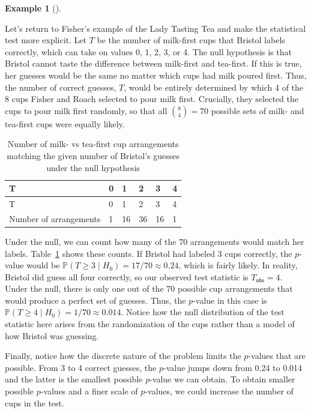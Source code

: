 \documentclass[
  13pt,
  letterpaper,
  DIV=11,
  numbers=noendperiod]{scrreprt}
\renewcommand{\P}{\mathbb{P}}
\theoremstyle{plain}
\theoremstyle{plain}
\theoremstyle{definition}
\theoremstyle{definition}
\newtheorem{example}{Example}[chapter]
\theoremstyle{remark}
\begin{document}
\begin{example}[]\protect\hypertarget{exm-lady-tasting-tea-2}{}\label{exm-lady-tasting-tea-2}

Let's return to Fisher's example of the Lady Tasting Tea and make the
statistical test more explicit. Let \(T\) be the number of milk-first
cups that Bristol labels correctly, which can take on values 0, 1, 2, 3,
or 4. The null hypothesis is that Bristol cannot taste the difference
between milk-first and tea-first. If this is true, her guesses would be
the same no matter which cups had milk poured first. Thus, the number of
correct guesses, \(T\), would be entirely determined by which 4 of the 8
cups Fisher and Roach selected to pour milk first. Crucially, they
selected the cups to pour milk first randomly, so that all
\(\binom{8}{4} = 70\) possible sets of milk- and tea-first cups were
equally likely.

\begin{longtable}[]{@{}llllll@{}}
\caption{Number of milk- vs tea-first cup arrangements matching the
given number of Bristol's guesses under the null
hypothesis}\label{tbl-lady-tasting-tea}\tabularnewline
\toprule\noalign{}
T & 0 & 1 & 2 & 3 & 4 \\
\midrule\noalign{}
\endfirsthead
\toprule\noalign{}
T & 0 & 1 & 2 & 3 & 4 \\
\midrule\noalign{}
\endhead
\bottomrule\noalign{}
\endlastfoot
Number of arrangements & 1 & 16 & 36 & 16 & 1 \\
\end{longtable}

Under the null, we can count how many of the 70 arrangements would match
her labels. Table~\ref{tbl-lady-tasting-tea} shows these counts. If
Bristol had labeled 3 cups correctly, the \(p\)-value would be
\(\P(T \geq 3 \mid H_0) = 17 / 70 \approx 0.24\), which is fairly
likely. In reality, Bristol did guess all four correctly, so our
observed test statistic is \(T_{\textsf{obs}} = 4\). Under the null,
there is only one out of the 70 possible cup arrangements that would
produce a perfect set of guesses. Thus, the \(p\)-value in this case is
\(\P(T \geq 4 \mid H_0) = 1 / 70 \approx 0.014\). Notice how the null
distribution of the test statistic here arises from the randomization of
the cups rather than a model of how Bristol was guessing.

Finally, notice how the discrete nature of the problem limits the
\(p\)-values that are possible. From 3 to 4 correct guesses, the
\(p\)-value jumps down from 0.24 to 0.014 and the latter is the smallest
possible \(p\)-value we can obtain. To obtain smaller possible
\(p\)-values and a finer scale of \(p\)-values, we could increase the
number of cups in the test.

\end{example}
\end{document}
